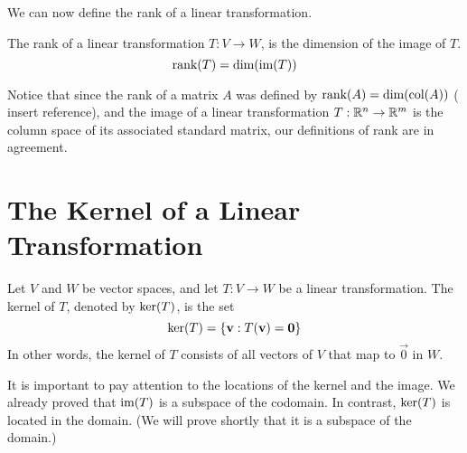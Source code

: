 \documentclass{ximera}
\begin{document}
We can now define the rank of a linear transformation.

\begin{definition}\label{def:rankofT}
The rank of a linear transformation $T:V\rightarrow W$, is the dimension of the image of $T$.
$$\textnormal{rank}(T)=\textnormal{dim}(\textnormal{im}(T))$$
\end{definition}

Notice that since the rank of a matrix $A$ was defined by $\textnormal{rank}(A) = \textnormal{dim}(\textnormal{col}(A))$ ({\color{red} insert reference}), and the image of a linear transformation $T:\RR^n\rightarrow \RR^m$ is the column space of its associated standard matrix, our definitions of rank are in agreement.

\section*{The Kernel of a Linear Transformation}

\begin{definition}
Let $V$ and $W$ be vector spaces, and let $T:V\rightarrow W$ be a linear transformation.  The kernel of $T$, denoted by $\textnormal{ker}(T)$, is the set
$$\textnormal{ker}(T)=\{\vec{v}:T(\vec{v})=\vec{0}\}$$
In other words, the kernel of $T$ consists of all vectors of $V$ that map to $\vec{0}$ in $W$.
\end{definition}
It is important to pay attention to the locations of the kernel and the image.  We already proved that $\textnormal{im}(T)$ is a subspace of the codomain.  In contrast, $\textnormal{ker}(T)$ is located in the domain.  (We will prove shortly that it is a subspace of the domain.)

\begin{image}
\end{image}
\end{document}
